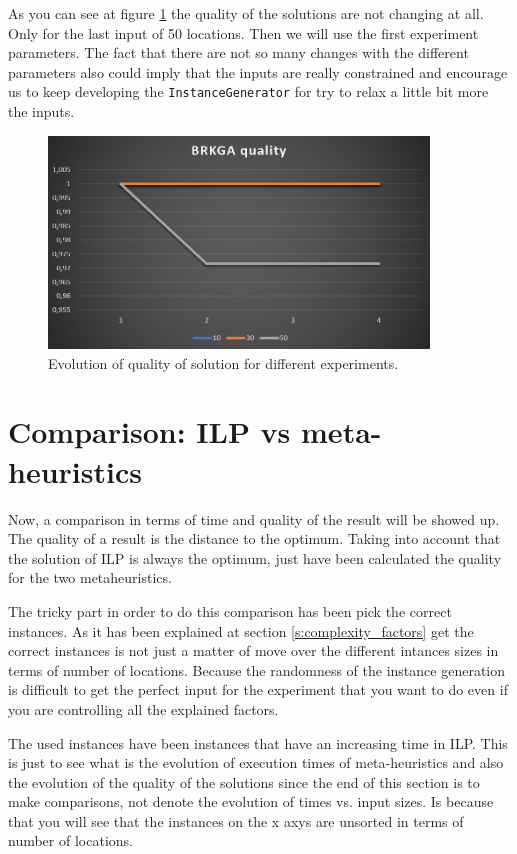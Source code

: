 \documentclass[]{report}
\begin{document}
As you can see at figure \ref{img:brkga_experiments} the quality of the solutions are not changing at all. Only for the last input of 50 locations. Then we will use the first experiment parameters. The fact that there are not so many changes with the different parameters also could imply that the inputs are really constrained and encourage us to keep developing the {\tt InstanceGenerator} for try to relax a little bit more the inputs.

\begin{figure}
	\caption{Evolution of quality of solution for different experiments.}
	\label{img:brkga_experiments}
	\centering
	\includegraphics[width=0.9\textwidth]{./imgs/brkga_experiments}
\end{figure}

\section{Comparison: ILP vs meta-heuristics}\label{s:comparison}

Now, a comparison in terms of time and quality of the result will be showed up. The quality of a result is the distance to the optimum. Taking into account that the solution of ILP is always the optimum, just have been calculated the quality for the two metaheuristics.

The tricky part in order to do this comparison has been pick the correct instances. As it has been explained at section \ref{s:complexity_factors} get the correct instances is not just a matter of move over the different intances sizes in terms of number of locations. Because the randomness of the instance generation is difficult to get the perfect input for the experiment that you want to do even if you are controlling all the explained factors.

The used instances have been instances that have an increasing time in ILP. This is just to see what is the evolution of execution times of meta-heuristics and also the evolution of the quality of the solutions since the end of this section is to make comparisons, not denote the evolution of times vs. input sizes. Is because that you will see that the instances on the x axys are unsorted in terms of number of locations.
\end{document}
